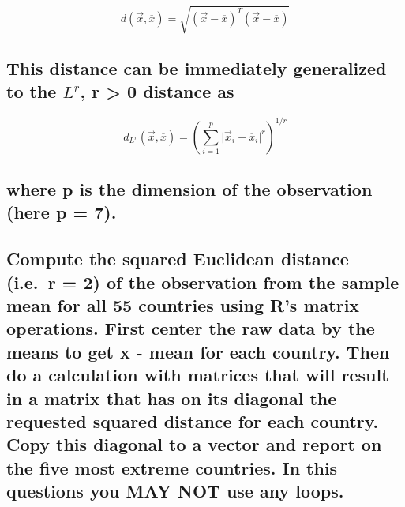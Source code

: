 \documentclass[]{article}
\begin{document}
\[d(\overrightarrow{x},\overline{x}) = \sqrt{(\overrightarrow{x} - \overline{x})^T (\overrightarrow{x} - \overline{x})}\]

\hypertarget{this-distance-can-be-immediately-generalized-to-the-lr-r-0-distance-as}{%
\subsection{\texorpdfstring{This distance can be immediately generalized
to the \(L^r\), r \textgreater{} 0 distance
as}{This distance can be immediately generalized to the L\^{}r, r \textgreater{} 0 distance as}}\label{this-distance-can-be-immediately-generalized-to-the-lr-r-0-distance-as}}

\[d_{L^r}(\overrightarrow{x} , \overline{x}) = \left( \sum_{i=1}^{p}{\lvert\overrightarrow{x}_i - \overline{x}_i\rvert^r} \right) ^ {1/r}\]

\hypertarget{where-p-is-the-dimension-of-the-observation-here-p-7.}{%
\subsection{where p is the dimension of the observation (here p =
7).}\label{where-p-is-the-dimension-of-the-observation-here-p-7.}}

\hypertarget{compute-the-squared-euclidean-distance-i.e.-r-2-of-the-observation-from-the-sample-mean-for-all-55-countries-using-rs-matrix-operations.-first-center-the-raw-data-by-the-means-to-get-x---mean-for-each-country.-then-do-a-calculation-with-matrices-that-will-result-in-a-matrix-that-has-on-its-diagonal-the-requested-squared-distance-for-each-country.-copy-this-diagonal-to-a-vector-and-report-on-the-five-most-extreme-countries.-in-this-questions-you-may-not-use-any-loops.}{%
\subsection{Compute the squared Euclidean distance (i.e.~r = 2) of the
observation from the sample mean for all 55 countries using R's matrix
operations. First center the raw data by the means to get x - mean for
each country. Then do a calculation with matrices that will result in a
matrix that has on its diagonal the requested squared distance for each
country. Copy this diagonal to a vector and report on the five most
extreme countries. In this questions you MAY NOT use any
loops.}\label{compute-the-squared-euclidean-distance-i.e.-r-2-of-the-observation-from-the-sample-mean-for-all-55-countries-using-rs-matrix-operations.-first-center-the-raw-data-by-the-means-to-get-x---mean-for-each-country.-then-do-a-calculation-with-matrices-that-will-result-in-a-matrix-that-has-on-its-diagonal-the-requested-squared-distance-for-each-country.-copy-this-diagonal-to-a-vector-and-report-on-the-five-most-extreme-countries.-in-this-questions-you-may-not-use-any-loops.}}
\end{document}
